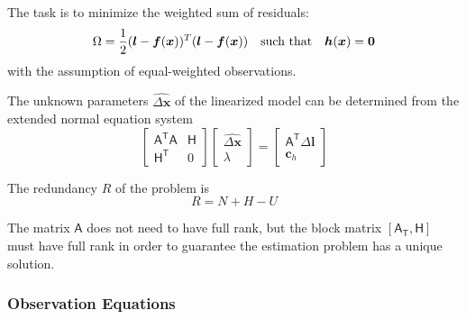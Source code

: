 
The task is to minimize the weighted sum of residuals:
\begin{equation}
\Omega=\dfrac{1}{2}(\boldsymbol l-\boldsymbol f(\boldsymbol x))^T(\boldsymbol l-\boldsymbol f(\boldsymbol x))\quad\textnormal{such that}\quad\boldsymbol h(\boldsymbol x)=\boldsymbol 0
\end{equation}
with the assumption of equal-weighted observations.

The unknown parameters $\widehat{\Delta\boldsymbol x}$ of the linearized model can be determined from the extended normal equation system
\begin{equation}
\begin{bmatrix}
\mathsf{A^TA} & \mathsf{H}\\
\mathsf{H^T} & 0
\end{bmatrix}
\begin{bmatrix}
\widehat{\Delta\boldsymbol x}\\
\lambda
\end{bmatrix}
=
\begin{bmatrix}
\mathsf{A^T}\Delta\boldsymbol l\\
\boldsymbol c_h
\end{bmatrix}
\end{equation}


The redundancy $R$ of the problem is
\begin{equation}
R=N+H-U
\end{equation}

The matrix $\mathsf{A}$ does not need to have full rank, but the block matrix $[\mathsf{A_T},\mathsf{H}]$ must have full rank in order to guarantee the estimation problem has a unique solution.


\subsubsection{Observation Equations}
\label{subsubsec:ObsEqua}


